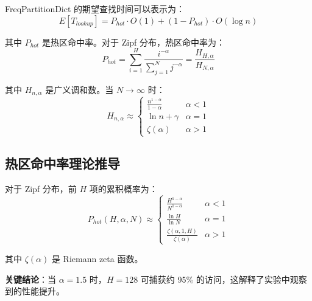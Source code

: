 \documentclass[11pt,a4paper]{article}
\begin{document}
FreqPartitionDict 的期望查找时间可以表示为：
\begin{equation}
E[T_{lookup}] = P_{hot} \cdot O(1) + (1 - P_{hot}) \cdot O(\log n)
\end{equation}

其中 $P_{hot}$ 是热区命中率。对于 Zipf 分布，热区命中率为：
\begin{equation}
P_{hot} = \sum_{i=1}^{H} \frac{i^{-\alpha}}{\sum_{j=1}^{N} j^{-\alpha}} = \frac{H_{H,\alpha}}{H_{N,\alpha}}
\end{equation}

其中 $H_{n,\alpha}$ 是广义调和数。当 $N \to \infty$ 时：
\begin{equation}
H_{n,\alpha} \approx \begin{cases}
\frac{n^{1-\alpha}}{1-\alpha} & \alpha < 1 \\
\ln n + \gamma & \alpha = 1 \\
\zeta(\alpha) & \alpha > 1
\end{cases}
\end{equation}

\subsection{热区命中率理论推导}

对于 Zipf 分布，前 $H$ 项的累积概率为：
\begin{equation}
P_{hot}(H, \alpha, N) \approx \begin{cases}
\frac{H^{1-\alpha}}{N^{1-\alpha}} & \alpha < 1 \\
\frac{\ln H}{\ln N} & \alpha = 1 \\
\frac{\zeta(\alpha, 1, H)}{\zeta(\alpha)} & \alpha > 1
\end{cases}
\end{equation}

其中 $\zeta(\alpha)$ 是 Riemann zeta 函数。

\textbf{关键结论}：当 $\alpha = 1.5$ 时，$H = 128$ 可捕获约 95\% 的访问，这解释了实验中观察到的性能提升。
\end{document}
